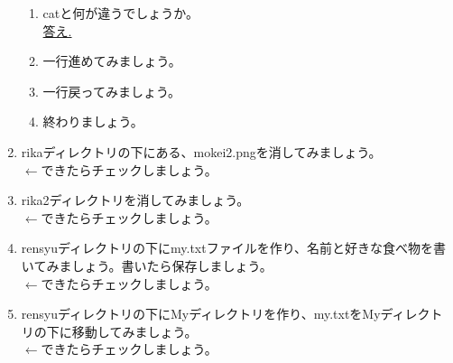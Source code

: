 \begin{tcolorbox}[title=\useOmetoi,breakable]
\begin{enumerate}
	\begin{enumerate}
	\item catと何が違うでしょうか。\\
	\underline{答え.\hspace{0.8\linewidth}}
	\item 一行進めてみましょう。
	\item 一行戻ってみましょう。
	\item 終わりましょう。
	\end{enumerate}
\item rikaディレクトリの下にある、mokei2.pngを消してみましょう。\\
\fbox{\phantom{白}} $\leftarrow$できたらチェックしましょう。
\item rika2ディレクトリを消してみましょう。\\
\fbox{\phantom{白}} $\leftarrow$できたらチェックしましょう。
\item rensyuディレクトリの下にmy.txtファイルを作り、名前と好きな食べ物を書いてみましょう。書いたら保存しましょう。\\
\fbox{\phantom{白}} $\leftarrow$できたらチェックしましょう。
\item rensyuディレクトリの下にMyディレクトリを作り、my.txtをMyディレクトリの下に移動してみましょう。\\
\fbox{\phantom{白}} $\leftarrow$できたらチェックしましょう。
\end{enumerate}
\end{tcolorbox}
